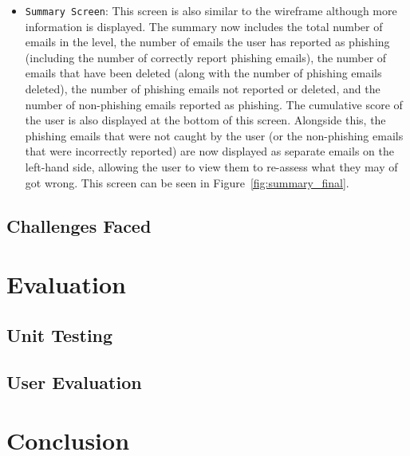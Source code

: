 \documentclass{l4proj}
\begin{document}
\begin{itemize}
\begin{itemize}
    \end{itemize}
  \item \verb|Summary Screen|: This screen is also similar to the wireframe although more information is displayed. The summary now includes the total number of emails in the level, the number of emails the user has reported as phishing (including the number of correctly report phishing emails), the number of emails that have been deleted (along with the number of phishing emails deleted), the number of phishing emails not reported or deleted, and the number of non-phishing emails reported as phishing. The cumulative score of the user is also displayed at the bottom of this screen. Alongside this, the phishing emails that were not caught by the user (or the non-phishing emails that were incorrectly reported) are now displayed as separate emails on the left-hand side, allowing the user to view them to re-assess what they may of got wrong. This screen can be seen in Figure~\ref{fig:summary_final}.
\end{itemize}

\section{Challenges Faced}





\chapter{Evaluation} 

\section{Unit Testing}

\section{User Evaluation}



\chapter{Conclusion}    
\end{document}
